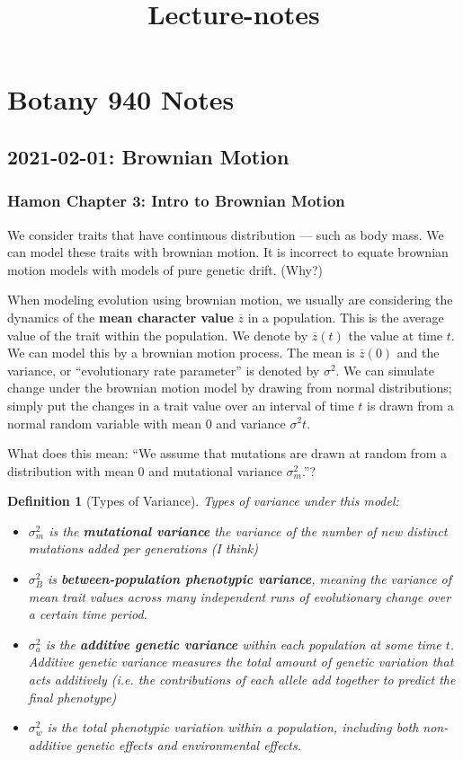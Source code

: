 \documentclass{article}
\title{Lecture-notes}
\newtheorem{definition}{Definition}
\newcommand{\1}[1]{\textbf{1}_{\left[#1\right]}} %
\newcommand{\advar}{\sigma_{a}^{2}} %
\newcommand{\bvar}{\sigma_{B}^{2}}  %
\newcommand{\mvar}{\sigma_{m}^{2}}  %
\newcommand{\wvar}{\sigma_{w}^{2}}  %
\begin{document}
\section{Botany 940 Notes}
\subsection{2021-02-01: Brownian Motion}

\subsubsection{Hamon Chapter 3: Intro to Brownian Motion}

We consider traits that have continuous distribution --- such as body mass. We
can model these traits with brownian motion. It is incorrect to equate brownian
motion models with models of pure genetic drift. (Why?)

When modeling evolution using brownian motion, we usually are considering the
dynamics of the \textbf{mean character value} $\overline{z}$ in a population.
This is the average value of the trait within the population. We denote by
$\overline{z}(t)$ the value at time $t$. We can model this by a brownian motion
process. The mean is $\overline{z}(0)$ and the variance, or ``evolutionary rate
parameter'' is denoted by $\sigma^{2}$. We can simulate change under the
brownian motion model by drawing from normal distributions; simply put the
changes in a trait value over an interval of time $t$ is drawn from a normal
random variable with mean 0 and variance $\sigma^{2}t$.


What does this mean: ``We assume that mutations are drawn at random from a
distribution with mean 0 and mutational variance $\sigma_{m}^{2}$.''?
\begin{definition}[Types of Variance]
Types of variance under this model:
\begin{itemize}
  \item $\mvar$ is the \textbf{mutational variance} the variance of the number of
    new distinct mutations added per generations (I think)
  \item $\bvar$ is \textbf{between-population phenotypic variance}, meaning the
    variance of mean trait values across many independent runs of evolutionary
    change over a certain time period.
  \item $\advar$ is the \textbf{additive genetic variance} within each
    population at some time $t$. Additive genetic variance measures the total
    amount of genetic variation that acts additively (i.e. the contributions of
    each allele add together to predict the final phenotype)
  \item $\wvar$ is the total phenotypic variation within a population, including
    both non-additive genetic effects and environmental effects.
\end{itemize}
\end{definition}
\end{document}
